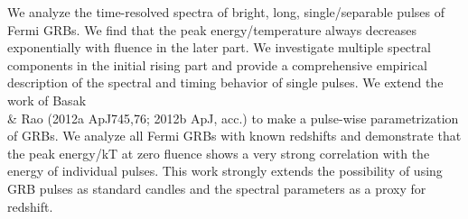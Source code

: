 


\bigskip



\bigskip

\noindent We analyze the time-resolved spectra of bright, long, single/separable pulses of Fermi GRBs. We find that the peak energy/temperature always decreases exponentially with fluence in the later part. We investigate multiple spectral components in the initial rising part and provide a comprehensive empirical description of the spectral and timing behavior of single pulses. We extend the work of Basak \\& Rao (2012a ApJ745,76; 2012b ApJ, acc.) to make a pulse-wise parametrization of GRBs. We analyze all Fermi GRBs with known redshifts and demonstrate that the peak energy/kT at zero fluence shows a very strong correlation with the energy of  individual pulses. This work strongly extends the possibility of using GRB pulses as standard candles and the spectral parameters as a proxy for redshift.
